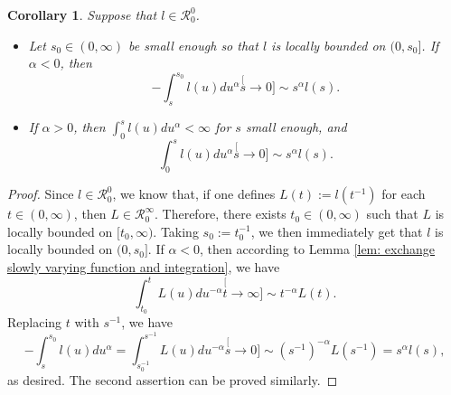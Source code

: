 \documentclass[12pt, a4paper]{amsart}
\newtheorem{cro}[thm]{Corollary}
\theoremstyle{definition}
\numberwithin{equation}{section}
\begin{document}
\begin{cro}
\label{cro: power law and ingetration}
	Suppose that $l\in \mathcal R^0_0$.
\begin{itemize}
\item
	Let $s_0\in (0,\infty)$ be small enough so that $l$ is locally bounded on $(0,s_0]$.
	If $\alpha < 0$, then
\begin{equation}
	-\int_s^{s_0} l(u)du^\alpha
	\stackrel[s\to 0]{}{\sim} s^{\alpha} l(s).
\end{equation}
\item
	If $\alpha > 0$, then $\int_0^s l(u)du^\alpha<\infty$ for $s$ small enough, and
\begin{equation}
	\int_0^s l(u)du^\alpha
	\stackrel[s\to 0]{}{\sim} s^{\alpha} l(s).
\end{equation}
\end{itemize}
\end{cro}	

\begin{proof}
	Since $l \in \mathcal R^0_0$, we know that, if one defines $L(t):=l(t^{-1})$ for each $t\in (0,\infty)$, then $ L \in \mathcal R^\infty_0$.
	Therefore, there exists $t_0\in (0,\infty)$ such that $L$ is locally bounded on $[t_0,\infty)$.
	Taking $s_0:= t_0^{-1}$, we then immediately get that $l$ is locally bounded on $(0,s_0]$.
	If $\alpha<0 $, then according to Lemma \ref{lem: exchange slowly varying function and integration}, we have
\begin{equation}
	\int_{t_0}^t L(u)du^{-\alpha}
	\stackrel[t\to \infty]{}{\sim} t^{-\alpha}  L(t).
\end{equation}
	Replacing $t$ with $s^{-1}$, we have
\begin{equation}
	-\int_{s}^{s_0} l(u)du^{\alpha}
	=\int_{s_0^{-1}}^{s^{-1}} L(u)du^{-\alpha}
	\stackrel[s\to 0]{}{\sim}  (s^{-1})^{-\alpha}L(s^{-1})
	=s^\alpha l(s),
\end{equation}
	as desired.
	The second assertion can be proved similarly.
\end{proof}

\end{document}
